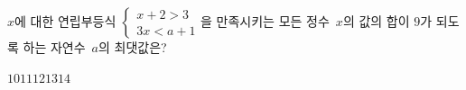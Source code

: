 $x$에 대한 연립부등식 $\begin{cases} x+2>3 \\ 3x<a+1 \end{cases}$을 만족시키는 모든 정수~$x$의 값의 합이 $9$가 되도록 하는 자연수~$a$의 최댓값은?
\begin{choices32}{$10$}{$11$}{$12$}{$13$}{$14$}\end{choices32}
